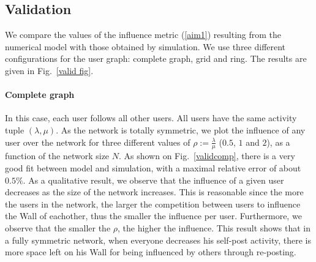 \documentclass[10pt, conference, letterpaper]{IEEEtran}
\begin{document}
{\subsection{Validation} \label{valid}

	
We compare the values of the influence metric (\ref{aim1}) resulting from the numerical model with those obtained by simulation. We use three different configurations for the user graph: complete graph, grid and ring. The results are given in Fig.~\ref{valid fig}.

\paragraph{Complete graph} In this case, each user follows all other users. All users have the same activity tuple $(\lambda,\mu)$.
As the network is totally symmetric, we plot the influence of any user over the network for three different values of $\rho:=\frac{\lambda}{\mu}$ ($0.5$, $1$ and $2$), as a function of the network size $N$. As shown on Fig.~\ref{validcomp}, there is a very good fit between model and simulation, with a maximal relative error of about $0.5\%$.
As a qualitative result, we observe that the influence of a given user decreases as the size of the network increases.  This is reasonable since the more the users in the network, the larger the competition between users to influence the Wall of eachother, thus the smaller the influence per user. Furthermore, we observe that the smaller the $\rho$, the higher the influence. This result shows that in a fully symmetric network, when everyone decreases his self-post activity, there is more space left on his Wall for being influenced by others through re-posting.
	
}
\end{document}
